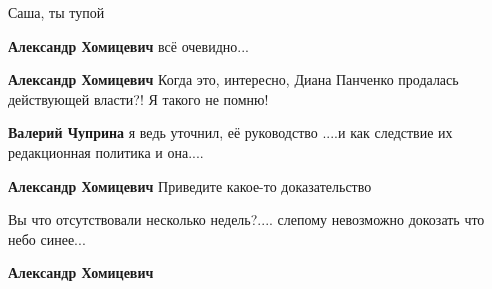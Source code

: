 \begin{itemize}
\begin{itemize}
Саша, ты тупой

 
\textbf{Александр Хомицевич} всё очевидно...

 
\textbf{Александр Хомицевич} Когда это, интересно, Диана Панченко продалась действующей власти?! Я такого не помню!

 
\textbf{Валерий Чуприна} я ведь уточнил, её руководство ....и как следствие их редакционная политика и она....

 
\textbf{Александр Хомицевич} Приведите какое-то доказательство

 
Вы что отсутствовали несколько недель?.... слепому невозможно докозать что небо синее...


 
\textbf{Александр Хомицевич} 🤦‍♂️

 

\end{itemize}
\end{itemize}
